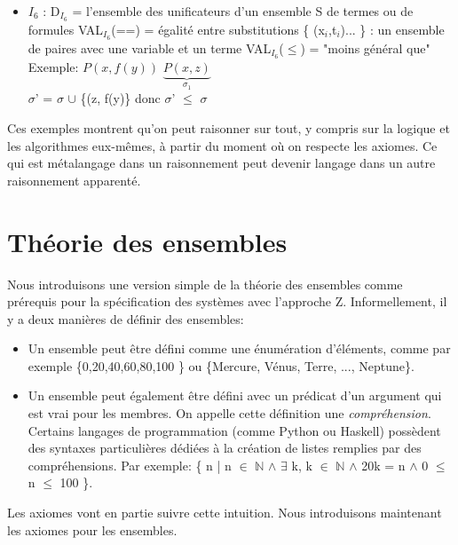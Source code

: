 {\begin{itemize}
\item \underline{$I_{6}$} : D$_{I_{6}}$ = l'ensemble des unificateurs d'un ensemble S de termes ou de formules
VAL$_{I_{6}}$(==) = égalité entre substitutions \{ (x$_{i}$,t$_{i}$)... \} : un ensemble de paires avec une variable et un terme VAL$_{I_{6}}$($\leq$) = "moins général que"\\
\newline
Exemple: $P(x,f(y))$ \hspace{1cm} $\underbrace{P(x,z)}_{\sigma_1}$\\
$\sigma$' = $\sigma$ $\cup$ \{(z, f(y)\} donc 
$\sigma$' $\leq$ $\sigma$\\
\end{itemize}
Ces exemples montrent qu'on peut raisonner sur tout, y compris sur la logique et les algorithmes eux-mêmes,
à partir du moment où on respecte les axiomes.
Ce qui est métalangage dans un raisonnement peut devenir langage dans un autre raisonnement apparenté.



\section{Théorie des ensembles}

Nous introduisons une version simple de la théorie des ensembles
comme prérequis pour la spécification des systèmes avec l'approche Z.
Informellement, il y a deux manières de définir des ensembles:
\begin{itemize}
\item Un ensemble peut être défini comme une énumération d'éléments, comme par exemple
\{0,20,40,60,80,100 \} ou \{Mercure, Vénus, Terre, ..., Neptune\}.
\item Un ensemble peut également être défini avec un prédicat d'un argument qui est vrai pour les membres.
On appelle cette définition une {\em compréhension}.
Certains langages de programmation (comme Python ou Haskell) possèdent des syntaxes particulières dédiées
à la création de listes remplies par des compréhensions.
Par exemple: \{ n | n $\in$ $\mathbb{N}$ $\wedge$ $\exists$ k, k $\in$ $\mathbb{N}$ $\wedge$ 20k = n $\wedge$ 0 $\leq$ n $\leq$ 100 \}.
\end{itemize}
Les axiomes vont en partie suivre cette intuition.
Nous introduisons maintenant les axiomes pour les ensembles.

}
